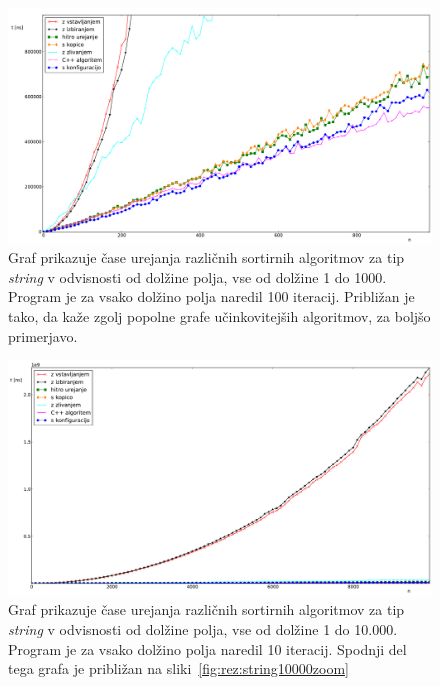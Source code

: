 \documentclass[a4paper,oneside,12pt]{article}
\begin{document}
\begin{figure}[h!]
    \includegraphics[width=\textwidth]{slike/string1000zoom.pdf}
    \vspace{-0.7cm}
    \caption[Rezultati za tip \emph{string}, 1000 el. -- približano]{Graf prikazuje čase
    urejanja različnih sortirnih algoritmov za tip \emph{string} v odvisnosti od dolžine polja, vse
    od dolžine 1 do 1000. Program je za vsako dolžino polja naredil 100
    iteracij. Približan je tako, da kaže zgolj popolne grafe učinkovitejših
    algoritmov, za boljšo primerjavo.}
    \label{fig:rez:string1000}
\end{figure}

\begin{figure}[h!]
    \includegraphics[width=\textwidth]{slike/string10000.pdf}
    \vspace{-0.7cm}
    \caption[Rezultati za tip \emph{string}, 10.000 el.]{Graf prikazuje čase
    urejanja različnih sortirnih algoritmov za tip \emph{string} v odvisnosti od dolžine polja, vse
    od dolžine 1 do 10.000. Program je za vsako dolžino polja naredil 10
    iteracij. Spodnji del tega grafa je približan na
    sliki~\ref{fig:rez:string10000zoom}}
    \label{fig:rez:string10000}
\end{figure}
\end{document}
